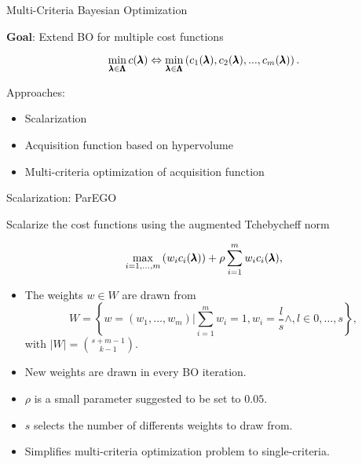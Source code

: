 \begin{frame}{Multi-Criteria Bayesian Optimization}

\textbf{Goal}: Extend BO for multiple cost functions

$$
\min_{\pmb{\lambda} \in \pmb{\Lambda}}  c(\pmb{\lambda}) \Leftrightarrow \min_{\pmb{\lambda} \in \pmb{\Lambda}} \left(c_1(\pmb{\lambda}), c_2(\pmb{\lambda}), ..., c_m(\pmb{\lambda})\right).
$$

Approaches:

\begin{itemize}
        \item Scalarization
        \item Acquisition function based on hypervolume
        \item Multi-criteria optimization of acquisition function
\end{itemize}


\end{frame}

\begin{frame}{Scalarization: ParEGO}

    Scalarize the cost functions using the augmented Tchebycheff norm

    $$
    \max_{i=1,\dots,m}\left(w_i c_i(\pmb{\lambda})\right) + \rho \sum_{i=1}^m w_ic_i(\pmb{\lambda}),
    $$

    \begin{itemize}
        \item The weights $w \in W$ are drawn from
            $$
                W = \left\{ w = (w_1, \dots, w_m) | \sum_{i=1}^m w_i = 1, w_i = \frac{l}{s} \wedge, l \in 0,\dots,s\right\},
            $$
            with $|W| = {{s+m-1}\choose{k-1}}$.
        \item New weights are drawn in every BO iteration.
        \item $\rho$ is a small parameter suggested to be set to $0.05$.
        \item $s$ selects the number of differents weights to draw from.
        \item Simplifies multi-criteria optimization problem to single-criteria.
    \end{itemize}


\end{frame}



